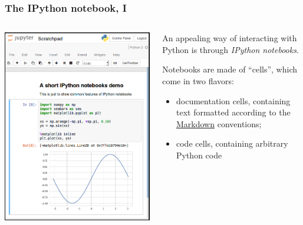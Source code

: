 \documentclass[english,serif,mathserif]{beamer}
\begin{document}
\begin{frame}
  \frametitle{The IPython notebook, I}

  \begin{columns}[t]
    \begin{column}{0.5\textwidth}
      \begin{center}
        \includegraphics[width=1.00\linewidth]{fig/nb.png}
      \end{center}
    \end{column}
    \begin{column}{0.5\textwidth}
      \small

      An appealing way of interacting with Python
      is through \emph{IPython notebooks}.

      \+
      Notebooks are made of ``cells'', which come in two flavors:
      \begin{itemize}
      \item documentation cells, containing text formatted according to the
        \href{http://commonmark.org/help/}{Markdown} conventions;
      \item code cells, containing arbitrary Python code
      \end{itemize}
    \end{column}
  \end{columns}
\end{frame}
\end{document}
